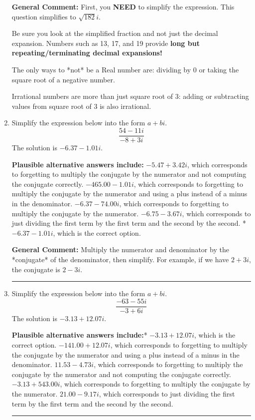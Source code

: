 \documentclass{extbook}[14pt]
\newcommand{\litem}[1]{\item #1

\rule{\textwidth}{0.4pt}}
\begin{document}
\begin{enumerate}
{\textbf{General Comment:} First, you \textbf{NEED} to simplify the expression. This question simplifies to $\sqrt{182} i$. 
 
 Be sure you look at the simplified fraction and not just the decimal expansion. Numbers such as 13, 17, and 19 provide \textbf{long but repeating/terminating decimal expansions!} 
 
 The only ways to *not* be a Real number are: dividing by 0 or taking the square root of a negative number. 
 
 Irrational numbers are more than just square root of 3: adding or subtracting values from square root of 3 is also irrational.
}
\litem{
Simplify the expression below into the form $a+bi$.
\[ \frac{54 - 11 i}{-8 + 3 i} \]The solution is \( -6.37  - 1.01 i \).\begin{enumerate}[label=\Alph*.]
\textbf{Plausible alternative answers include:} $-5.47  + 3.42 i$, which corresponds to forgetting to multiply the conjugate by the numerator and not computing the conjugate correctly.
 $-465.00  - 1.01 i$, which corresponds to forgetting to multiply the conjugate by the numerator and using a plus instead of a minus in the denominator.
 $-6.37  - 74.00 i$, which corresponds to forgetting to multiply the conjugate by the numerator.
 $-6.75  - 3.67 i$, which corresponds to just dividing the first term by the first term and the second by the second.
* $-6.37  - 1.01 i$, which is the correct option.
\end{enumerate}

\textbf{General Comment:} Multiply the numerator and denominator by the *conjugate* of the denominator, then simplify. For example, if we have $2+3i$, the conjugate is $2-3i$.
}
\litem{
Simplify the expression below into the form $a+bi$.
\[ \frac{-63 - 55 i}{-3 + 6 i} \]The solution is \( -3.13  + 12.07 i \).\begin{enumerate}[label=\Alph*.]
\textbf{Plausible alternative answers include:}* $-3.13  + 12.07 i$, which is the correct option.
 $-141.00  + 12.07 i$, which corresponds to forgetting to multiply the conjugate by the numerator and using a plus instead of a minus in the denominator.
 $11.53  - 4.73 i$, which corresponds to forgetting to multiply the conjugate by the numerator and not computing the conjugate correctly.
 $-3.13  + 543.00 i$, which corresponds to forgetting to multiply the conjugate by the numerator.
 $21.00  - 9.17 i$, which corresponds to just dividing the first term by the first term and the second by the second.
\end{enumerate}

}
\end{enumerate}
\end{document}
